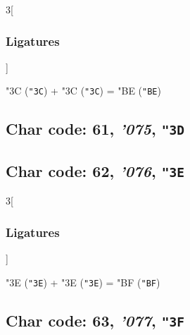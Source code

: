 \documentclass{article}
\newlength{\maxcharwidth}
\begin{document}
\begin{multicols}{3}[\subsubsection{Ligatures}]

{\testfont\char"3C\noboundary} ({\tt"3C}) + {\testfont\char"3C\noboundary} ({\tt"3C}) = {\testfont\char"BE\noboundary} ({\tt"BE}) 

\end{multicols}

\subsection{Char code: 61, {\it'075}, {\tt"3D}}
\label{char_61}


\subsection{Char code: 62, {\it'076}, {\tt"3E}}
\label{char_62}


\begin{multicols}{3}[\subsubsection{Ligatures}]

{\testfont\char"3E\noboundary} ({\tt"3E}) + {\testfont\char"3E\noboundary} ({\tt"3E}) = {\testfont\char"BF\noboundary} ({\tt"BF}) 

\end{multicols}

\subsection{Char code: 63, {\it'077}, {\tt"3F}}
\label{char_63}
\end{document}
